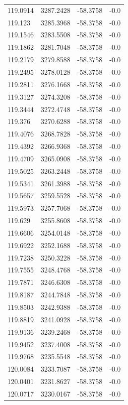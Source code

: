 \begin{table}[H]
\begin{tabular}{llll}
119.0914 & 3287.2428 & -58.3758 & -0.0 \\
119.123 & 3285.3968 & -58.3758 & -0.0 \\
119.1546 & 3283.5508 & -58.3758 & -0.0 \\
119.1862 & 3281.7048 & -58.3758 & -0.0 \\
119.2179 & 3279.8588 & -58.3758 & -0.0 \\
119.2495 & 3278.0128 & -58.3758 & -0.0 \\
119.2811 & 3276.1668 & -58.3758 & -0.0 \\
119.3127 & 3274.3208 & -58.3758 & -0.0 \\
119.3444 & 3272.4748 & -58.3758 & -0.0 \\
119.376 & 3270.6288 & -58.3758 & -0.0 \\
119.4076 & 3268.7828 & -58.3758 & -0.0 \\
119.4392 & 3266.9368 & -58.3758 & -0.0 \\
119.4709 & 3265.0908 & -58.3758 & -0.0 \\
119.5025 & 3263.2448 & -58.3758 & -0.0 \\
119.5341 & 3261.3988 & -58.3758 & -0.0 \\
119.5657 & 3259.5528 & -58.3758 & -0.0 \\
119.5973 & 3257.7068 & -58.3758 & -0.0 \\
119.629 & 3255.8608 & -58.3758 & -0.0 \\
119.6606 & 3254.0148 & -58.3758 & -0.0 \\
119.6922 & 3252.1688 & -58.3758 & -0.0 \\
119.7238 & 3250.3228 & -58.3758 & -0.0 \\
119.7555 & 3248.4768 & -58.3758 & -0.0 \\
119.7871 & 3246.6308 & -58.3758 & -0.0 \\
119.8187 & 3244.7848 & -58.3758 & -0.0 \\
119.8503 & 3242.9388 & -58.3758 & -0.0 \\
119.8819 & 3241.0928 & -58.3758 & -0.0 \\
119.9136 & 3239.2468 & -58.3758 & -0.0 \\
119.9452 & 3237.4008 & -58.3758 & -0.0 \\
119.9768 & 3235.5548 & -58.3758 & -0.0 \\
120.0084 & 3233.7087 & -58.3758 & -0.0 \\
120.0401 & 3231.8627 & -58.3758 & -0.0 \\
120.0717 & 3230.0167 & -58.3758 & -0.0 \\

\end{tabular}
\end{table}
